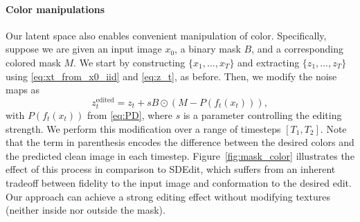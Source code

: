 \paragraph{Color manipulations}
Our latent space also enables convenient manipulation of color. 
Specifically, suppose we are given an input image $x_0$, a binary mask $B$, and a corresponding colored mask $M$. We start by constructing $\{x_1,\ldots,x_T\}$ and extracting $\{z_1,\ldots,z_T\}$ using \eqref{eq:xt_from_x0_iid} and \eqref{eq:z_t}, as before. Then, we modify the noise maps as
\begin{equation}
\label{eq:zt_mask}
z_t^{\text{edited}} = z_t + s B\odot ( M-P(f_t(x_t))),
\end{equation}
with $P(f_t(x_t))$ from \eqref{eq:PD}, where $s$ is a parameter controlling the editing strength. We perform this modification over a range of timesteps $[T_1,T_2]$. Note that the term in parenthesis encodes the difference between the desired colors and the predicted clean image in each timestep. 
Figure~\ref{fig:mask_color} illustrates the effect of this process in comparison to SDEdit, which suffers from an inherent tradeoff between fidelity to the input image and conformation to the desired edit. Our approach can achieve a strong editing effect without modifying textures (neither inside nor outside the mask). %








